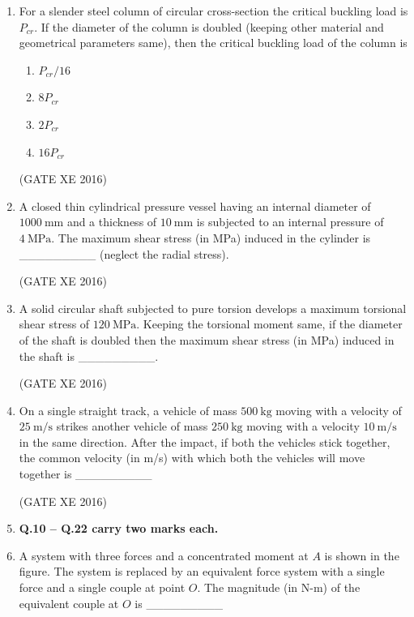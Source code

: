 \documentclass[12pt]{article}
\begin{document}
\begin{enumerate}
(GATE XE 2016)

\item For a slender steel column of circular cross-section the critical buckling load is $P_{cr}$. If the diameter of the column is doubled (keeping other material and geometrical parameters same), then the critical buckling load of the column is

\begin{multicols}{4}
\begin{enumerate}
\item $P_{cr}/16$
\item $8P_{cr}$
\item $2P_{cr}$
\item $16P_{cr}$
\end{enumerate}
\end{multicols}

(GATE XE 2016)

\item A closed thin cylindrical pressure vessel having an internal diameter of $1000 \ \text{mm}$ and a thickness of $10 \ \text{mm}$ is subjected to an internal pressure of $4 \ \text{MPa}$. The maximum shear stress (in MPa) induced in the cylinder is \_\_\_\_\_\_\_\_\_ (neglect the radial stress).

(GATE XE 2016)

\item A solid circular shaft subjected to pure torsion develops a maximum torsional shear stress of $120 \ \text{MPa}$. Keeping the torsional moment same, if the diameter of the shaft is doubled then the maximum shear stress (in MPa) induced in the shaft is \_\_\_\_\_\_\_\_\_.

(GATE XE 2016)

\item On a single straight track, a vehicle of mass $500 \ \text{kg}$ moving with a velocity of $25 \ \text{m/s}$ strikes another vehicle of mass $250 \ \text{kg}$ moving with a velocity $10 \ \text{m/s}$ in the same direction. After the impact, if both the vehicles stick together, the common velocity (in m/s) with which both the vehicles will move together is \_\_\_\_\_\_\_\_\_ 

(GATE XE 2016)


\item[] \textbf{Q.10 -- Q.22 carry two marks each.}

\item A system with three forces and a concentrated moment at $A$ is shown in the figure. The system is replaced by an equivalent force system with a single force and a single couple at point $O$. The magnitude (in N-m) of the equivalent couple at $O$ is \_\_\_\_\_\_\_\_\_


\end{enumerate}
\end{document}
